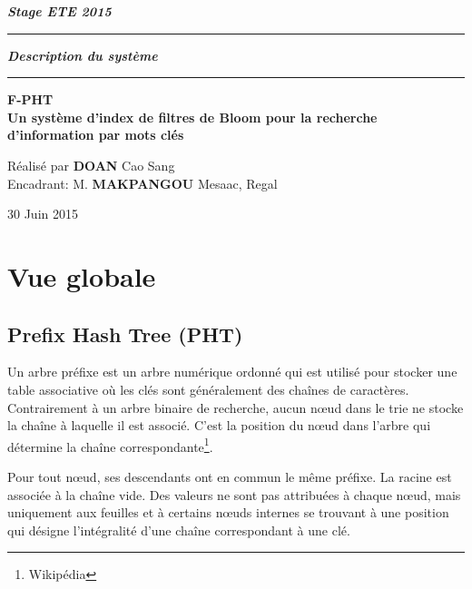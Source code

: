 \documentclass[a4paper,11pt]{report}
\begin{document}
	\begin{titlepage}
		\begin{center}
			\large\bfseries\itshape Stage ETE 2015\\
		\end{center}
		\noindent\rule{\linewidth}{3pt}

		\begin{center}
			\Huge\bfseries\itshape Description du système\\
		\end{center}
		
		\noindent\rule{\linewidth}{3pt}
		\begin{center}
			\bfseries
			\large F-PHT \\
			\large Un système d'index de filtres de Bloom pour la recherche d'information par mots clés
		\end{center}
		\begin{center}
			Réalisé par \textbf{DOAN} Cao Sang \\
			Encadrant: M. \textbf{MAKPANGOU} Mesaac, Regal
		\end{center}
		\begin{center}
			30 Juin 2015
		\end{center}
	\end{titlepage}

\tableofcontents

\chapter{Vue globale}
\section{Prefix Hash Tree (PHT)}
	Un arbre préfixe est un arbre numérique ordonné qui est utilisé pour stocker une table associative où les clés sont généralement des chaînes de caractères. Contrairement à un arbre binaire de recherche, aucun nœud dans le trie ne stocke la chaîne à laquelle il est associé. C'est la position du nœud dans l'arbre qui détermine la chaîne correspondante\footnote{Wikipédia}.
	
	Pour tout nœud, ses descendants ont en commun le même préfixe. La racine est associée à la chaîne vide. Des valeurs ne sont pas attribuées à chaque nœud, mais uniquement aux feuilles et à certains nœuds internes se trouvant à une position qui désigne l'intégralité d'une chaîne correspondant à une clé.
	
\end{document}
